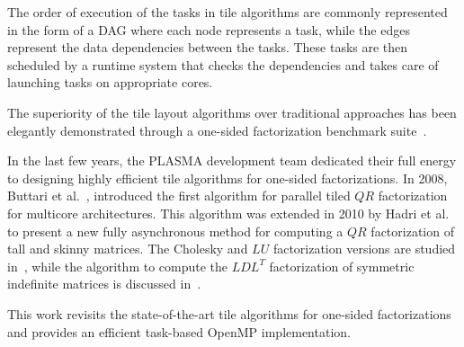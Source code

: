 The order of execution of the tasks in tile algorithms are commonly
represented in the form of a DAG where each node represents a task, while
the edges represent the data dependencies between the tasks.  These
tasks are then scheduled by a runtime system that checks the
dependencies and takes care of launching tasks on appropriate cores.

The superiority of the tile layout algorithms over traditional
approaches has been elegantly demonstrated through a one-sided
factorization benchmark suite~\cite{agullo2009comparative}.

In the last few years,
the PLASMA development team dedicated their full
energy to designing highly efficient tile
algorithms for one-sided factorizations.
In 2008, Buttari et al.~\cite{buttari2008parallel},
introduced the first algorithm for parallel tiled $QR$ factorization for
multicore architectures.
This algorithm was extended in 2010 by
Hadri et al.~\cite{hadri2010tile} to present a new fully asynchronous
method for computing a $QR$ factorization of tall and skinny matrices.
The Cholesky and $LU$ factorization versions are studied
in~\cite{DBLP:journals/corr/abs-0709-1272}, while the algorithm to
compute the $LDL^T$ factorization of symmetric indefinite matrices is
discussed in~\cite{becker2011towards}.

This work revisits the state-of-the-art tile algorithms for
one-sided factorizations and provides an
efficient task-based OpenMP implementation.
